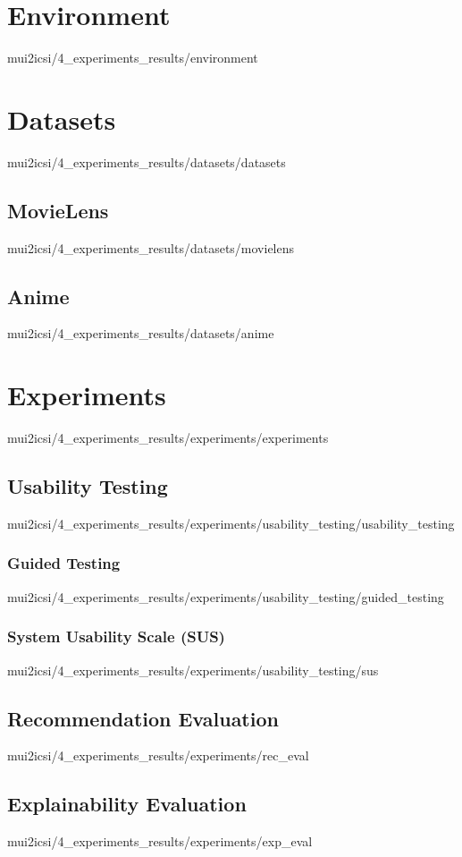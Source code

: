 \documentclass[english,epsbased,copyright,final,printable,covers,extendedindex,firstnumbered,tfm,gnuplot,loc,loe,lof,lot]{tfgtfmthesisuam}
\begin{document}
    \section{Environment\label{SEC:ENVIRONMENT}}{mui2icsi/4_experiments_results/environment}

    \section{Datasets\label{SEC:DATASETS}}{mui2icsi/4_experiments_results/datasets/datasets}
      \subsection{MovieLens\label{SS:MOVIELENS}}{mui2icsi/4_experiments_results/datasets/movielens}
      \subsection{Anime\label{SS:LASTFM}}{mui2icsi/4_experiments_results/datasets/anime}

    \section{Experiments\label{SEC:EXPERIMENTS}}{mui2icsi/4_experiments_results/experiments/experiments}
      \subsection{Usability Testing\label{SS:USABILITYTEST}}{mui2icsi/4_experiments_results/experiments/usability_testing/usability_testing}
        \subsubsection{Guided Testing\label{SSS:GUIDEDTEST}}{mui2icsi/4_experiments_results/experiments/usability_testing/guided_testing}
        \subsubsection{System Usability Scale (SUS)\label{SSS:SUS}}{mui2icsi/4_experiments_results/experiments/usability_testing/sus}
      \subsection{Recommendation Evaluation\label{SS:RECEVAL}}{mui2icsi/4_experiments_results/experiments/rec_eval}
      \subsection{Explainability Evaluation\label{SS:EXPLAINEVAL}}{mui2icsi/4_experiments_results/experiments/exp_eval}
\end{document}
